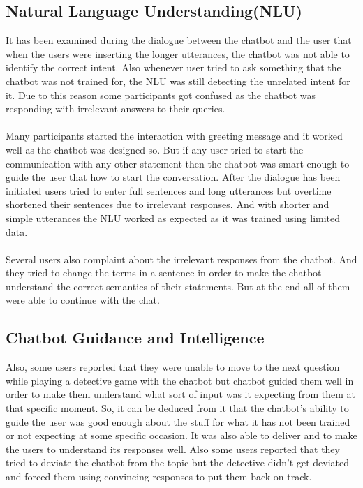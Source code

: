 \subsection{Natural Language Understanding(NLU)}
It has been examined during the dialogue between the chatbot and the user that when the users were inserting the longer utterances, the chatbot was not able to identify the correct intent. Also whenever user tried to ask something that the chatbot was not trained for, the NLU was still detecting the unrelated intent for it. Due to this reason some participants got confused as the chatbot was responding with irrelevant answers to their queries.
\\~\\
Many participants started the interaction with greeting message and it worked well as the chatbot was designed so. But if any user tried to start the communication with any other statement then the chatbot was smart enough to guide the user that how to start the conversation. After the dialogue has been initiated users tried to enter full sentences and long utterances but overtime shortened their sentences due to irrelevant responses. And with shorter and simple utterances the NLU worked as expected as it was trained using limited data.
\\~\\
Several users also complaint about the irrelevant responses from the chatbot. And they tried to change the terms in a sentence in order to make the chatbot understand the correct semantics of their statements. But at the end all of them were able to continue with the chat.

\subsection{Chatbot Guidance and Intelligence}
Also, some users reported that they were unable to move to the next question while playing a detective game with the chatbot but chatbot guided them well in order to make them understand what sort of input was it expecting from them at that specific moment. So, it can be deduced from it that the chatbot's ability to guide the user was good enough about the stuff for what it has not been trained or not expecting at some specific occasion. It was also able to deliver and to make the users to understand its responses well. Also some users reported that they tried to deviate the chatbot from the topic but the detective didn't get deviated and forced them using convincing responses to put them back on track.

